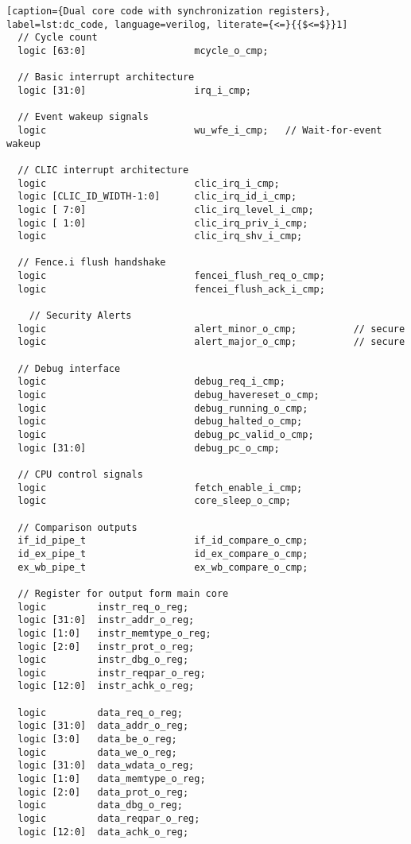 \begin{lstlisting}[caption={Dual core code with synchronization registers}, label=lst:dc_code, language=verilog, literate={<=}{{$<=$}}1]
  // Cycle count
  logic [63:0]                   mcycle_o_cmp;

  // Basic interrupt architecture
  logic [31:0]                   irq_i_cmp;

  // Event wakeup signals
  logic                          wu_wfe_i_cmp;   // Wait-for-event wakeup

  // CLIC interrupt architecture
  logic                          clic_irq_i_cmp;
  logic [CLIC_ID_WIDTH-1:0]      clic_irq_id_i_cmp;
  logic [ 7:0]                   clic_irq_level_i_cmp;
  logic [ 1:0]                   clic_irq_priv_i_cmp;
  logic                          clic_irq_shv_i_cmp;

  // Fence.i flush handshake
  logic                          fencei_flush_req_o_cmp;
  logic                          fencei_flush_ack_i_cmp;

    // Security Alerts
  logic                          alert_minor_o_cmp;          // secure
  logic                          alert_major_o_cmp;          // secure

  // Debug interface
  logic                          debug_req_i_cmp;
  logic                          debug_havereset_o_cmp;
  logic                          debug_running_o_cmp;
  logic                          debug_halted_o_cmp;
  logic                          debug_pc_valid_o_cmp;
  logic [31:0]                   debug_pc_o_cmp;

  // CPU control signals
  logic                          fetch_enable_i_cmp;
  logic                          core_sleep_o_cmp;

  // Comparison outputs 
  if_id_pipe_t                   if_id_compare_o_cmp;
  id_ex_pipe_t                   id_ex_compare_o_cmp;
  ex_wb_pipe_t                   ex_wb_compare_o_cmp;

  // Register for output form main core
  logic         instr_req_o_reg;         
  logic [31:0]  instr_addr_o_reg;        
  logic [1:0]   instr_memtype_o_reg;     
  logic [2:0]   instr_prot_o_reg;        
  logic         instr_dbg_o_reg;         
  logic         instr_reqpar_o_reg;      
  logic [12:0]  instr_achk_o_reg;        

  logic         data_req_o_reg;          
  logic [31:0]  data_addr_o_reg;         
  logic [3:0]   data_be_o_reg;           
  logic         data_we_o_reg;           
  logic [31:0]  data_wdata_o_reg;        
  logic [1:0]   data_memtype_o_reg;      
  logic [2:0]   data_prot_o_reg;           
  logic         data_dbg_o_reg;          
  logic         data_reqpar_o_reg;       
  logic [12:0]  data_achk_o_reg;       


\end{lstlisting}
